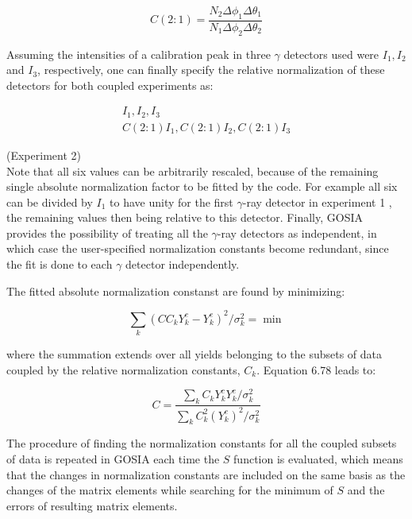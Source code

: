 \documentclass[10pt]{article}
\begin{document}
\begin{equation*}
C(2: 1)=\frac{N_{2} \Delta \phi_{1} \Delta \theta_{1}}{N_{1} \Delta \phi_{2} \Delta \theta_{2}} \tag{6.81}
\end{equation*}


Assuming the intensities of a calibration peak in three $\gamma$ detectors used were $I_{1}, I_{2}$ and $I_{3}$, respectively, one can finally specify the relative normalization of these detectors for both coupled experiments as:


\begin{gather*}
I_{1}, I_{2}, I_{3}  \tag{Experiment1}\\
C(2: 1) I_{1}, C(2: 1) I_{2}, C(2: 1) I_{3}
\end{gather*}


(Experiment 2)\\
Note that all six values can be arbitrarily rescaled, because of the remaining single absolute normalization factor to be fitted by the code. For example all six can be divided by $I_{1}$ to have unity for the first $\gamma$-ray detector in experiment 1 , the remaining values then being relative to this detector. Finally, GOSIA provides the possibility of treating all the $\gamma$-ray detectors as independent, in which case the user-specified normalization constants become redundant, since the fit is done to each $\gamma$ detector independently.

The fitted absolute normalization constanst are found by minimizing:


\begin{equation*}
\sum_{k}\left(C C_{k} Y_{k}^{c}-Y_{k}^{e}\right)^{2} / \sigma_{k}^{2}=\min \tag{6.82}
\end{equation*}


where the summation extends over all yields belonging to the subsets of data coupled by the relative normalization constants, $C_{k}$. Equation 6.78 leads to:


\begin{equation*}
C=\frac{\sum_{k} C_{k} Y_{k}^{c} Y_{k}^{e} / \sigma_{k}^{2}}{\sum_{k} C_{k}^{2}\left(Y_{k}^{c}\right)^{2} / \sigma_{k}^{2}} \tag{6.83}
\end{equation*}


The procedure of finding the normalization constants for all the coupled subsets of data is repeated in GOSIA each time the $S$ function is evaluated, which means that the changes in normalization constants are included on the same basis as the changes of the matrix elements while searching for the minimum of $S$ and the errors of resulting matrix elements.
\end{document}
